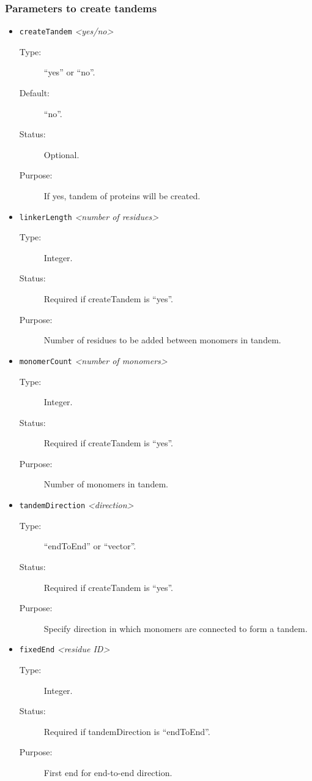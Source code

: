 \documentclass[a4paper]{article}
\begin{document}
\subsubsection{Parameters to create tandems}
\begin{itemize}

\item \texttt{createTandem} \textit{\textless yes/no\textgreater}
\begin{description}
\item[Type:] ``yes'' or ``no''.
\item[Default:] ``no''.
\item[Status:] Optional.
\item[Purpose:] If yes, tandem of proteins will be created.
\end{description}

\item \texttt{linkerLength} \textit{\textless number of residues\textgreater}
\begin{description}
\item[Type:] Integer.
\item[Status:] Required if createTandem is ``yes''.
\item[Purpose:] Number of residues to be added between monomers in tandem.
\end{description}

\item \texttt{monomerCount} \textit{\textless number of monomers\textgreater}
\begin{description}
\item[Type:] Integer.
\item[Status:] Required if createTandem is ``yes''.
\item[Purpose:] Number of monomers in tandem.
\end{description}

\item \texttt{tandemDirection} \textit{\textless direction\textgreater}
\begin{description}
\item[Type:] ``endToEnd'' or ``vector''.
\item[Status:] Required if createTandem is ``yes''.
\item[Purpose:] Specify direction in which monomers are connected to form a tandem.
\end{description}

\item \texttt{fixedEnd} \textit{\textless residue ID\textgreater}
\begin{description}
\item[Type:] Integer.
\item[Status:] Required if tandemDirection is ``endToEnd''.
\item[Purpose:] First end for end-to-end direction.
\end{description}


\end{itemize}
\end{document}

